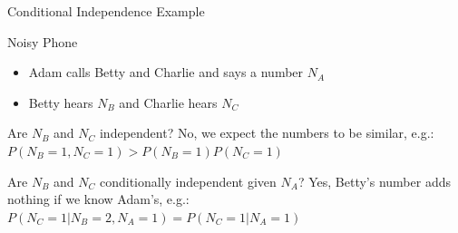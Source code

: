 \documentclass[12pt]{beamer}
\begin{document}
\begin{frame}{Conditional Independence Example}
	\begin{block}{Noisy Phone}
		\begin{itemize}
			\item Adam calls Betty and Charlie and says a number $N_{A}$
			\item Betty hears $N_{B}$ and Charlie hears $N_{C}$
		\end{itemize}
	\end{block}
	\pause
	\begin{block}{Are $N_{B}$ and $N_{C}$ independent?}
		\pause
		No, we expect the numbers to be similar, e.g.: \\[.5em]
		$P(N_{B}\!=\!1, N_{C}\!=\!1) > P(N_{B}\!=\!1)P(N_{C}\!=\!1)$
	\end{block}
	\pause
	\begin{block}{Are $N_{B}$ and $N_{C}$ conditionally independent given $N_{A}$?}
		\pause
		Yes, Betty's number adds nothing if we know Adam's, e.g.: \\[.5em]
		$P(N_{C}\!=\!1|N_{B}\!=\!2,N_{A}\!=\!1) = P(N_{C}\!=\!1|N_{A}\!=\!1)$
	\end{block}
\end{frame}
\end{document}
